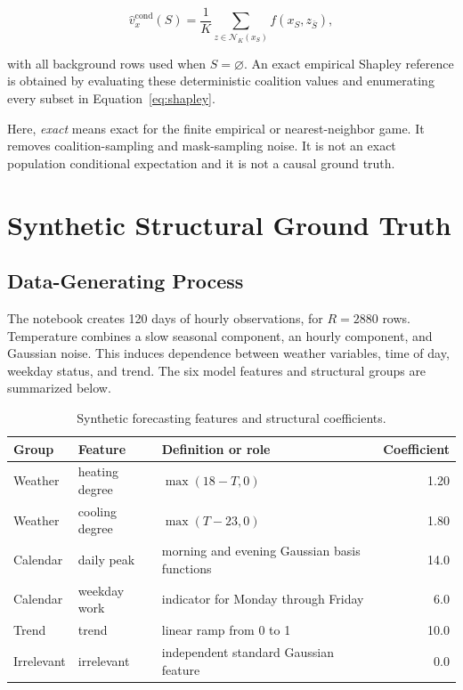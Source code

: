 \documentclass[11pt]{article}
\begin{document}
\begin{equation}
\widehat v_x^{\mathrm{cond}}(S)
=\frac{1}{K}\sum_{z\in\mathcal N_K(x_S)}f(x_S,z_{\bar S}),
\label{eq:exact-conditional}
\end{equation}

with all background rows used when \(S=\varnothing\).  An exact empirical
Shapley reference is obtained by evaluating these deterministic coalition
values and enumerating every subset in Equation~\eqref{eq:shapley}.

Here, \emph{exact} means exact for the finite empirical or nearest-neighbor
game.  It removes coalition-sampling and mask-sampling noise.  It is not an
exact population conditional expectation and it is not a causal ground truth.

\section{Synthetic Structural Ground Truth}

\subsection{Data-Generating Process}

The notebook creates 120 days of hourly observations, for \(R=2880\) rows.
Temperature combines a slow seasonal component, an hourly component, and
Gaussian noise.  This induces dependence between weather variables, time of
day, weekday status, and trend.  The six model features and structural groups
are summarized below.

\begin{table}[H]
\centering
\small
\begin{tabularx}{\textwidth}{@{}l l Y r@{}}
\toprule
Group & Feature & Definition or role & Coefficient \\
\midrule
Weather & heating degree & \(\max(18-T,0)\) & 1.20 \\
Weather & cooling degree & \(\max(T-23,0)\) & 1.80 \\
Calendar & daily peak & morning and evening Gaussian basis functions & 14.0 \\
Calendar & weekday work & indicator for Monday through Friday & 6.0 \\
Trend & trend & linear ramp from 0 to 1 & 10.0 \\
Irrelevant & irrelevant & independent standard Gaussian feature & 0.0 \\
\bottomrule
\end{tabularx}
\caption{Synthetic forecasting features and structural coefficients.}
\label{tab:features}
\end{table}
\end{document}
